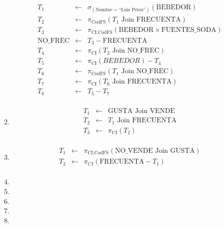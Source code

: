 \documentclass[12pt]{article}
\newcommand{\asig}{\ensuremath{\leftarrow}}
\begin{document}
\begin{enumerate}
\begin{eqnarray*}
 T_1 & \asig & \sigma_{(\text{Nombre}=\text{``Luis Pérez''})}(\text{BEBEDOR}) \\
 T_2 & \asig & \pi_{\text{CodFS}}(T_1 \text{ Join } \text{FRECUENTA}) \\ %
 T_3 & \asig & \pi_{\text{CI,CodFS}}(\text{BEBEDOR} \times \text{FUENTES\_SODA}) \\
 \text{NO\_FREC} & \asig & T_3 - \text{FRECUENTA} \\ %
 T_4 & \asig & \pi_{\text{CI}}(T_2 \text{ Join } \text{NO\_FREC}) \\ %
 T_5 & \asig & \pi_{\text{CI}}(BEBEDOR) - T_4 \\
 T_6 & \asig & \pi_{\text{CodFS}}(T_1 \text{ Join } \text{NO\_FREC}) \\ %
 T_7 & \asig & \pi_{\text{CI}}(T_6 \text{ Join } \text{FRECUENTA}) \\ %
 T_8 & \asig & T_5 - T_7 \\
\end{eqnarray*}

 \item 

\begin{eqnarray*}
 T_1 & \asig & \text{GUSTA} \text{ Join } \text{VENDE} \\
 T_2 & \asig & T_1 \text{ Join } \text{FRECUENTA} \\
 T_3 & \asig & \pi_{\text{CI}}(T_2) \\
\end{eqnarray*}

 \item 

\begin{eqnarray*}
 T_1 & \asig & \pi_{\text{CI,CodFS}}(\text{NO\_VENDE} \text{ Join } \text{GUSTA}) \\
 T_2 & \asig & \pi_{CI}(\text{FRECUENTA}-T_1) \\
\end{eqnarray*}

 \item 

 \item 

 \item 

 \item 

 \item 

\end{enumerate}
\end{document}
